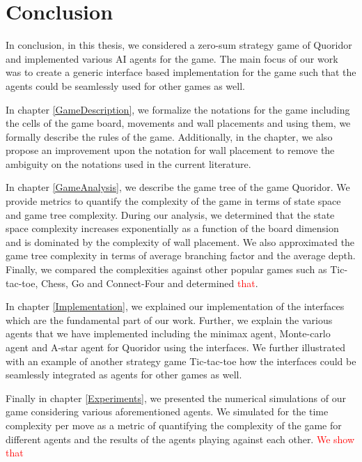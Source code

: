 \chapter{Conclusion}\label{Conclusion}

In conclusion, in this thesis, we considered a zero-sum strategy game of Quoridor and implemented various AI agents for the game. The main focus of our work was to create a generic interface based implementation for the game such that the agents could be seamlessly used for other games as well.

In chapter \ref{GameDescription}, we formalize the notations for the game including the cells of the game board, movements and wall placements and using them, we formally describe the rules of the game. Additionally, in the chapter, we also propose an improvement upon the notation for wall placement to remove the ambiguity on the notations used in the current literature.

In chapter \ref{GameAnalysis}, we describe the game tree of the game Quoridor. We provide metrics to quantify the complexity of the game in terms of state space and game tree complexity. During our analysis, we determined that the state space complexity increases exponentially as a function of the board dimension and is dominated by the complexity of wall placement. We also approximated the game tree complexity in terms of average branching factor and the average depth. Finally, we compared the complexities against other popular games such as Tic-tac-toe, Chess, Go and Connect-Four and determined \textcolor{red}{that}.

In chapter \ref{Implementation}, we explained our implementation of the interfaces which are the fundamental part of our work. Further, we explain the various agents that we have implemented including the minimax agent, Monte-carlo agent and A-star agent for Quoridor using the interfaces. We further illustrated with an example of another strategy game Tic-tac-toe how the interfaces could be seamlessly integrated as agents for other games as well. 

Finally in chapter \ref{Experiments}, we presented the numerical simulations of our game considering various aforementioned agents. We simulated for the time complexity per move as a metric of quantifying the complexity of the game for different agents and the results of the agents playing against each other. \textcolor{red}{We show that}
